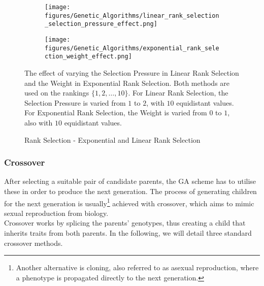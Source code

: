\begin{figure}[H]
    \centering
    \begin{subfigure}[t]{0.8\textwidth}
        \centering
        \texttt{[image: figures/Genetic\_Algorithms/linear\_rank\_selection\_selection\_pressure\_effect.png]}
    \end{subfigure}
    \begin{subfigure}[b]{0.8\textwidth}
        \centering
        \texttt{[image: figures/Genetic\_Algorithms/exponential\_rank\_selection\_weight\_effect.png]}
    \end{subfigure}

    \caption{Rank Selection - Exponential and Linear Rank Selection}
    \small
    \raggedright
    The effect of varying the Selection Pressure in Linear Rank Selection and the Weight in Exponential Rank Selection. Both methods are used on the rankings $\{1, 2, \hdots , 10\}$. For Linear Rank Selection, the Selection Pressure is varied from $1$ to $2$, with $10$ equidistant values. For Exponential Rank Selection, the Weight is varied from $0$ to $1$, also with $10$ equidistant values.
    \label{fig:GA_Rank_Selection_Visualisation}
\end{figure}

\subsubsection{Crossover}\label{subsubsec:Crossover}
After selecting a suitable pair of candidate parents, the GA scheme has to utilise these in order to produce the next generation. The process of generating children for the next generation is usually\footnote{Another alternative is cloning, also referred to as asexual reproduction, where a phenotype is propagated directly to the next generation.} achieved with crossover, which aims to mimic sexual reproduction from biology.
\\
Crossover works by splicing the parents' genotypes, thus creating a child that inherits traits from both parents. In the following, we will detail three standard crossover methods.

